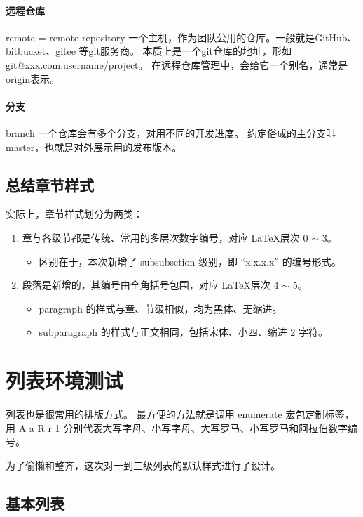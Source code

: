 \documentclass[../Main/thesis]{subfiles}
\begin{document}
\paragraph{远程仓库}
remote = remote repository
一个主机，作为团队公用的仓库。一般就是GitHub、bitbucket、gitee 等git服务商。
本质上是一个git仓库的地址，形如 git@xxx.com:username/project。
在远程仓库管理中，会给它一个别名，通常是origin表示。

\paragraph{分支}
branch
一个仓库会有多个分支，对用不同的开发进度。
约定俗成的主分支叫master，也就是对外展示用的发布版本。

\subsection{总结章节样式}
\label{ssc:summary-title-formats}

实际上，章节样式划分为两类：
\begin{enumerate}[(1)]
  \item 章与各级节都是传统、常用的多层次数字编号，对应 \LaTeX 层次 0 $\sim$ 3。
  \begin{itemize}[\textbullet]
    \item 区别在于，本次新增了 subsubsetion 级别，即 “x.x.x.x” 的编号形式。
  \end{itemize}
  \item 段落是新增的，其编号由全角括号包围，对应 \LaTeX 层次 4 $\sim$ 5。
  \begin{itemize}[\textbullet]
    \item paragraph 的样式与章、节级相似，均为黑体、无缩进。
    \item subparagraph 的样式与正文相同，包括宋体、小四、缩进 2 字符。
  \end{itemize}
\end{enumerate}

\section{列表环境测试} \label{sec:list}

列表也是很常用的排版方式。
最方便的方法就是调用 enumerate 宏包定制标签，用 A a R r 1 分别代表大写字母、小写字母、大写罗马、小写罗马和阿拉伯数字编号。

为了偷懒和整齐，这次对一到三级列表的默认样式进行了设计。

\subsection{基本列表} \label{ssc:basiclist}
\end{document}
